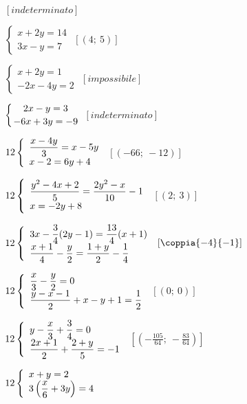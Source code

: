 \begin{esercizio}[*]
\begin{htmulticols}{2}
\begin{enumeratea}
 \hfill \(\left[indeterminato\right]\)
\item \(\left\{\begin{array}{l}x+2y=14\\3x-y=7\end{array}\right.\)
 \hfill \(\left[(4;~5)\right]\)
\item \(\left\{\begin{array}{l}x+2y=1\\-2x-4y=2\end{array}\right.\)
 \hfill \(\left[impossibile\right]\)
\item \(\left\{\genfrac{}{}{0pt}{0}{2x-y=3}{-6x+3y=-9}\right.\)
 \hfill \(\left[indeterminato\right]\)
 \item \(\arraystretch{2}\left\{\begin{array}{l}
\dfrac{x-4y}{3}=x-5y\\
x-2=6y+4 \end{array}\right.\)
 \hfill \(\left[(-66;~-12)\right]\)
\item \(\arraystretch{2}\left\{\begin{array}{l}
\dfrac{y^{2}-4x+2}{5}=\dfrac{2y^{2}-x}{10}-1\\
x=-2y+8\end{array}\right.\)
 \hfill \(\left[(2;~3)\right]\)
\item \(\arraystretch{2}\left\{\begin{array}{l}
3x-\dfrac{3}{4}(2y-1)=\dfrac{13}{4}(x+1)\\
\dfrac{x+1}{4}-\dfrac{y}{2}=\dfrac{1+y}{2}-\dfrac{1}{4}\end{array}\right.\)
 \hfill \(\left[\coppia{-4}{-1}\right]\)
\item \(\arraystretch{2}\left\{\begin{array}{l}
\dfrac{x}{3}-\dfrac{y}{2}=0\\
\dfrac{y-x-1}{2}+x-y+1=\dfrac{1}{2}\end{array}\right.\)
 \hfill \(\left[(0;~0)\right]\)
\item \(\arraystretch{2}\left\{\begin{array}{l}
y-\dfrac{x}{3}+\dfrac{3}{4}=0\\
\dfrac{2x+1}{2}+\dfrac{2+y}{5}=-1
\end{array}\right.\)
 \hfill \(\left[\left(-{\frac{105}{64}};~-\frac{83}{64}\right)\right]\)
\item \(\arraystretch{2}\left\{\begin{array}{l}
x+y=2\\
3\left(\dfrac{x}{6}+3y\right)=4\end{array}\right.\)

\end{enumeratea}
\end{htmulticols}
\end{esercizio}
